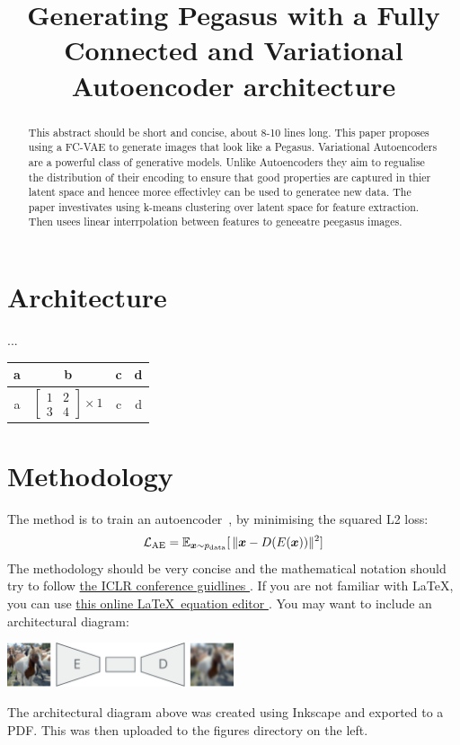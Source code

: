 \documentclass{article}
\title{Generating Pegasus with a Fully Connected and Variational Autoencoder architecture}
\begin{document}
\maketitle
\begin{abstract}
    This abstract should be short and concise, about 8-10 lines long.
    This paper proposes using a FC-VAE to generate images that look like a Pegasus.  Variational Autoencoders are a powerful class of generative models. Unlike Autoencoders they aim to regualise the distribution of their encoding to ensure that good properties are captured in thier latent space and hencee moree effectivley can be used to generatee new data. The paper investivates using k-means clustering over latent space for feature extraction. Then usees linear interrpolation between features to geneeatre peegasus images.
\end{abstract}

\section{Architecture}
...

\begin{tabular}{c|c|c|c}
    a&b&c&d\\
    \hline
    a & $\begin{bmatrix} 1 & 2 \\ 3 & 4 \end{bmatrix} \times 1$&c&d\\
\end{tabular}


\section{Methodology}
The method is to train an autoencoder~\cite{kramer1991nonlinear}, by minimising the squared L2 loss:
\begin{equation}
    \mathcal{L}_{\textrm{AE}} = \mathbb{E}_{{\bm{x}}\sim p_{\textrm{data}}}[\, \lVert {\bm{x}} - D(E({\bm{x}})) \rVert^2 ]
\end{equation}
The methodology should be very concise and the mathematical notation should try to follow \href{https://v1.overleaf.com/latex/templates/template-for-iclr-2021-conference-submission/mmpfhsxmqdkp.pdf}{the ICLR conference guidlines \faExternalLink}. If you are not familiar with \LaTeX, you can use \href{https://www.codecogs.com/latex/eqneditor.php}{this online \LaTeX~equation editor \faExternalLink}. You may want to include an architectural diagram:
\begin{center}
    \includegraphics[width=0.5\textwidth]{figures/architecture.pdf}
\end{center}
The architectural diagram above was created using Inkscape and exported to a PDF. This was then uploaded to the figures directory on the left.
\end{document}
